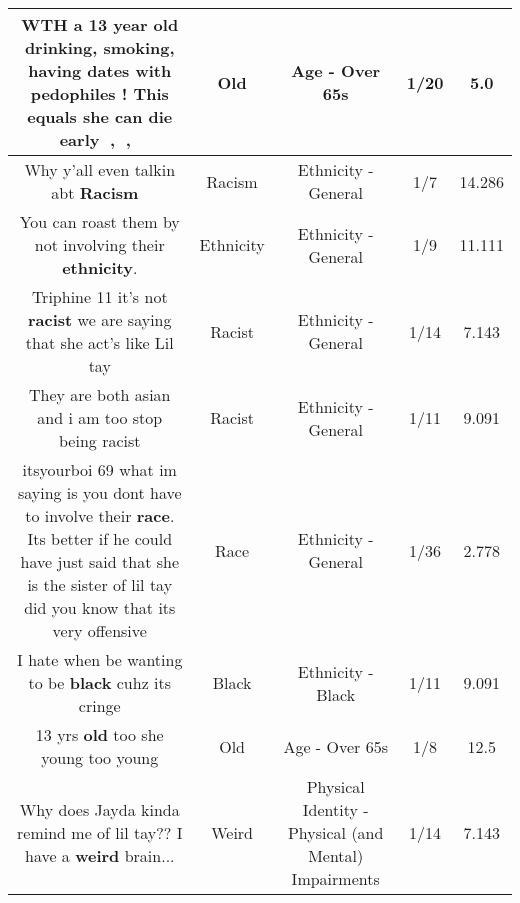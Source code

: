 \documentclass[11pt]{article}
\newlength\mylength
\begin{document}
\begin{center}
\begin{longtable}{|C{.65\mylength}|C{.30\mylength}|C{.12\mylength}|C{.12\mylength}|C{.12\mylength}|}
  \small WTH a 13 year \textbf{old} drinking, smoking, having dates with pedophiles ! This equals she can die early 🍺,🚬 ,👴🏾\normalsize   & Old & Age - Over 65s & 1/20 & 5.0 \\  \hline
  \small Why y'all even talkin abt \textbf{Racism} 🚨\normalsize   & Racism & Ethnicity - General & 1/7 & 14.286 \\  \hline
  \small You can roast them by not involving their \textbf{ethnicity}.\normalsize   & Ethnicity & Ethnicity - General & 1/9 & 11.111 \\  \hline
  \small Triphine 11 it's not \textbf{racist} we are saying that she act's like Lil tay\normalsize   & Racist & Ethnicity - General & 1/14 & 7.143 \\  \hline
  \small They are both asian and i am too stop being racist\normalsize   & Racist & Ethnicity - General & 1/11 & 9.091 \\  \hline
  \small itsyourboi 69 what im saying is you dont have to involve their \textbf{race}. Its better if he could have just said that she is the sister of lil tay did you know that its very offensive\normalsize   & Race & Ethnicity - General & 1/36 & 2.778 \\  \hline
  \small I hate when be wanting to be \textbf{black} cuhz its cringe\normalsize   & Black & Ethnicity - Black & 1/11 & 9.091 \\  \hline
  \small 13 yrs \textbf{old} too she young too young\normalsize   & Old & Age - Over 65s & 1/8 & 12.5 \\  \hline
  \small Why does Jayda kinda remind me of lil tay?? I have a \textbf{weird} brain...\normalsize   & Weird & Physical Identity - Physical (and Mental) Impairments & 1/14 & 7.143 \\  \hline

\end{longtable}
\end{center}
\end{document}
